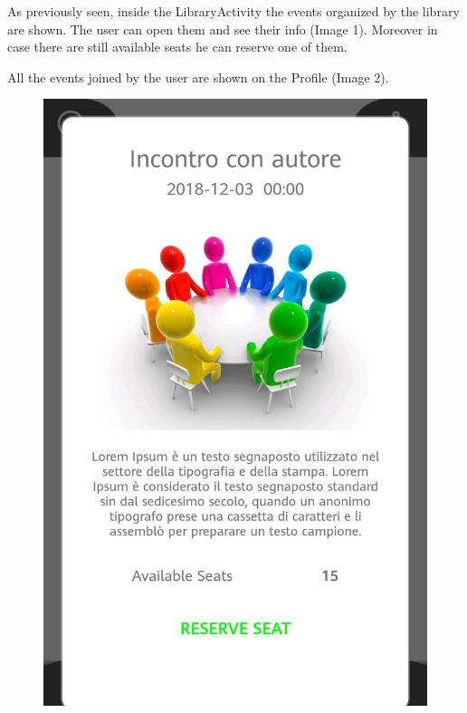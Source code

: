 \newpage
{}
As previously seen, inside the LibraryActivity the events organized by the library are shown. The user can open them and see their info (Image 1). Moreover in case there are still available seats he can reserve one of them.\par
All the events joined by the user are shown on the Profile (Image 2).
\begin{figure}[H]
	\centering
	\includegraphics[scale=0.15]{Images/UI/Events/1}
	\hspace{0.5cm}

\end{figure}
